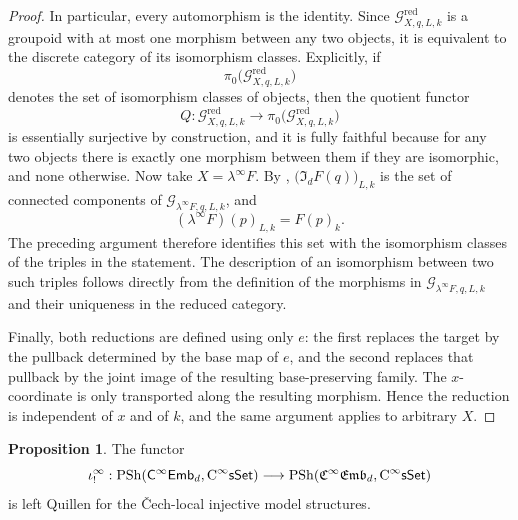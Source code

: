\documentclass{amsart}
\newcommand{\cat}[1]{\mathsf{#1}}
\newcommand{\sset}{\cat{sSet}}
\newcommand{\CsSet}{\textnormal{C}^{\infty}\sset}
\newcommand{\fembnoniso}[1]{\cat{C}^{\infty}\cat{Emb}_{#1}}
\newcommand{\femb}[1]{\mathfrak{C}^{\infty}\mathfrak{Emb}_{#1}}
\newcommand{\psh}{\mathrm{PSh}}
\theoremstyle{definition}
\newtheorem{proposition}[equation]{Proposition}
\numberwithin{equation}{subsection}
\numberwithin{subsubsection}{subsection}
\begin{document}
\begin{proof}
  In particular, every automorphism is the identity. Since
  \(\mathcal{G}^{\mathrm{red}}_{X,q,L,k}\) is a groupoid with at most one
  morphism between any two objects, it is equivalent to the discrete category
  of its isomorphism classes. Explicitly, if
  \[
    \pi_0\bigl(\mathcal{G}^{\mathrm{red}}_{X,q,L,k}\bigr)
  \]
  denotes the set of isomorphism classes of objects, then the quotient functor
  \[
    Q:
    \mathcal{G}^{\mathrm{red}}_{X,q,L,k}\longrightarrow
    \pi_0\bigl(\mathcal{G}^{\mathrm{red}}_{X,q,L,k}\bigr)
  \]
  is essentially surjective by construction, and it is fully faithful because
  for any two objects there is exactly one morphism between them if they are
  isomorphic, and none otherwise.
  Now take \(X=\lambda^\infty F\). By
  ,
  \(\bigl(\mathfrak{I}_{d}F(q)\bigr)_{L,k}\) is the set of connected
  components of \(\mathcal{G}_{\lambda^\infty F,q,L,k}\), and
  \[
    (\lambda^\infty F)(p)_{L,k}=F(p)_k.
  \]
  The preceding argument therefore identifies this set with the isomorphism
  classes of the triples in the statement. The description of an isomorphism
  between two such triples follows directly from the definition of the
  morphisms in \(\mathcal{G}_{\lambda^\infty F,q,L,k}\) and their uniqueness
  in the reduced category.

  Finally, both reductions are defined using only \(e\): the first replaces
  the target by the pullback determined by the base map of \(e\), and the
  second replaces that pullback by the joint image of the resulting
  base-preserving family. The \(x\)-coordinate is only transported along the
  resulting morphism. Hence the reduction is independent of \(x\) and of
  \(k\), and the same argument applies to arbitrary \(X\).
\end{proof}

\begin{proposition}\label{prop:iota.left.quillen}
  The functor
  \[
    \iota_{!}^{\infty}:
    \psh(\fembnoniso{d},\CsSet)\longrightarrow
    \psh(\femb{d},\CsSet)
  \]
  is left Quillen for the \v{C}ech-local injective model structures.
\end{proposition}
\end{document}
